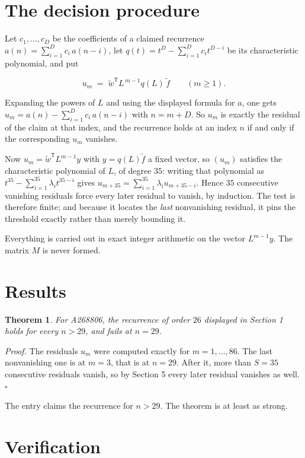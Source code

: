 \documentclass[11pt]{article}
\newtheorem{theorem}{Theorem}
\theoremstyle{definition}
\begin{document}
\section{The decision procedure}

Let $c_1,\dots,c_D$ be the coefficients of a claimed recurrence $a(n) = \sum_{i=1}^{D} c_i\,a(n-i)$, let $q(t) = t^{D} - \sum_{i=1}^{D} c_i t^{D-i}$ be its characteristic polynomial, and put

\[u_m \;=\; \tilde w^{\mathsf T} L^{\,m-1} q(L)\,\tilde f \qquad (m \ge 1).\]

Expanding the powers of $L$ and using the displayed formula for $a$, one gets $u_m = a(n) - \sum_{i=1}^{D} c_i\,a(n-i)$ with $n = m + D$. So $u_m$ is exactly the residual of the claim at that index, and the recurrence holds at an index $n$ if and only if the corresponding $u_m$ vanishes.

Now $u_m = \tilde w^{\mathsf T} L^{m-1} y$ with $y = q(L)\tilde f$ a fixed vector, so $(u_m)$ satisfies the characteristic polynomial of $L$, of degree $35$: writing that polynomial as $t^{35} - \sum_{i=1}^{35} \lambda_i t^{35-i}$ gives $u_{m+35} = \sum_{i=1}^{35} \lambda_i u_{m+35-i}$. Hence $35$ consecutive vanishing residuals force every later residual to vanish, by induction. The test is therefore finite; and because it locates the {\itshape last} nonvanishing residual, it pins the threshold exactly rather than merely bounding it.

Everything is carried out in exact integer arithmetic on the vector $L^{m-1}y$. The matrix $M$ is never formed.

\section{Results}

\begin{theorem} For A268806, the recurrence of order $26$ displayed in Section 1 holds for every $n > 29$, and fails at $n = 29$.\end{theorem}

{\itshape Proof.} The residuals $u_m$ were computed exactly for $m = 1,\dots,86$. The last nonvanishing one is at $m = 3$, that is at $n = 29$. After it, more than $S = 35$ consecutive residuals vanish, so by Section 5 every later residual vanishes as well. $\square$

The entry claims the recurrence for $n > 29$. The theorem is at least as strong.

\section{Verification}
\end{document}
